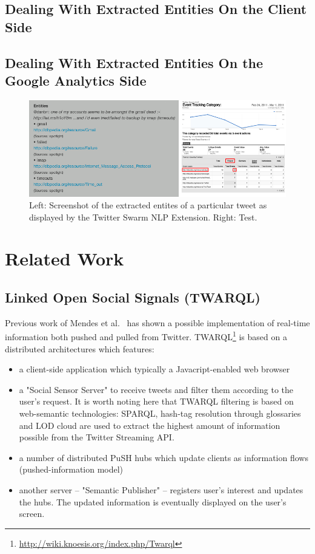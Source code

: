 \documentclass[runningheads,a4paper]{llncs}
\begin{document}
\subsection{Dealing With Extracted Entities On the Client Side}
\subsection{Dealing With Extracted Entities On the Google Analytics Side}

\begin{figure}[h!]
  \centering
  \includegraphics[width=0.95\linewidth]{combined.png}
  \caption{Left: Screenshot of the extracted entites of a particular tweet as displayed by the Twitter Swarm NLP Extension. Right: Test.}
  \label{fig:dataflow}
\end{figure}

\section{Related Work}

\subsection{Linked Open Social Signals (TWARQL)}
Previous work of Mendes et al.~\cite{Mendes:LOSS} has shown a possible implementation of real-time information both pushed and pulled from Twitter.
TWARQL\footnote{\url{http://wiki.knoesis.org/index.php/Twarql}} is based on a distributed architectures which features: 
\begin{itemize}
\item a client-side application which typically a Javacript-enabled web browser
\item a "Social Sensor Server" to receive tweets and filter them according to the user's request. It is worth noting here that TWARQL filtering is based on web-semantic technologies: SPARQL, hash-tag resolution through glossaries and LOD cloud are used to extract the highest amount of information possible from the Twitter Streaming API.
\item a number of distributed PuSH hubs which update clients as information flows (pushed-information model)
\item another server -- "Semantic Publisher" -- registers user's interest and updates the hubs. The updated information is eventually displayed on the user's screen.
\end{itemize}
\end{document}
